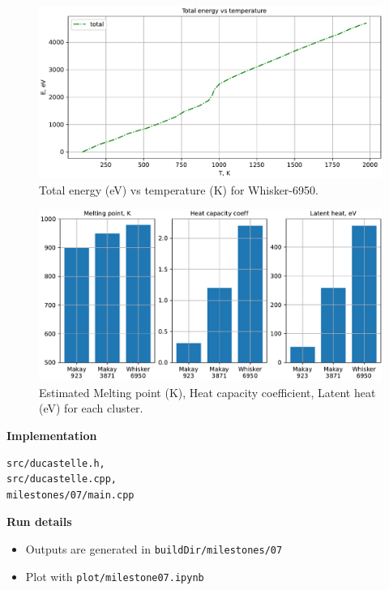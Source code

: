 \documentclass[12pt,a4paper]{article}
\begin{document}
\begin{figure}[h!]
	\centering
	\includegraphics[width=.95\linewidth]{img/milestone07-whisker.pdf}
	\caption{Total energy (eV) vs temperature (K) for Whisker-6950.}
	\label{fig:heat-whisker}
\end{figure}

\begin{figure}[h!]
	\centering
	\includegraphics[width=.9\linewidth]{img/milestone07-bar.pdf}
	\caption{Estimated Melting point (K), Heat capacity coefficient, Latent heat (eV) for each cluster.}
	\label{fig:heat-estimated}
\end{figure}

\newpage

{\bf Implementation}
\begin{lstlisting}[breaklines]
src/ducastelle.h,
src/ducastelle.cpp,
milestones/07/main.cpp
\end{lstlisting}

{\bf Run details}
\begin{itemize}
	\item Outputs are generated in \verb|buildDir/milestones/07|
	\item Plot with \verb|plot/milestone07.ipynb|
\end{itemize}

\newpage
\end{document}
